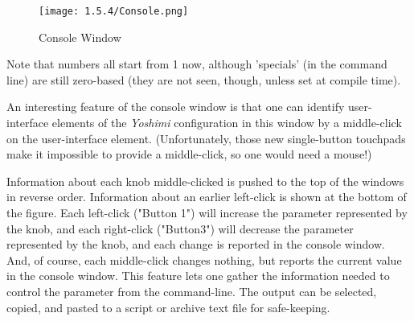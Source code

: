 \begin{figure}[H]
   \centering 
   \texttt{[image: 1.5.4/Console.png]}
   \caption[Yoshimi Console Window]{Console Window}
   \label{fig:console_window}
\end{figure}

    Note that numbers all start from 1 now, although 'specials' (in the command
    line) are still zero-based (they are not seen, though,
    unless set at compile time).

   An interesting feature of the console window is that one can identify
   user-interface elements of the \textsl{Yoshimi} configuration in this window
   by a middle-click on the user-interface element.
   (Unfortunately, those new single-button touchpads make it impossible to
   provide a middle-click, so one would need a mouse!)



   Information about each knob middle-clicked is pushed to the top of the
   windows in reverse order.
   Information about an earlier left-click is shown at the bottom of the figure.
   Each left-click ("Button 1") will increase the parameter represented by the
   knob, and each right-click ("Button3") will decrease the parameter
   represented by the knob, and each change is reported in the console window.
   And, of course, each middle-click changes nothing, but reports the current
   value in the console window.
   This feature lets one gather the information needed to
   control the parameter from the command-line.
   The output can be selected, copied, and pasted to a script or archive text
   file for safe-keeping.


